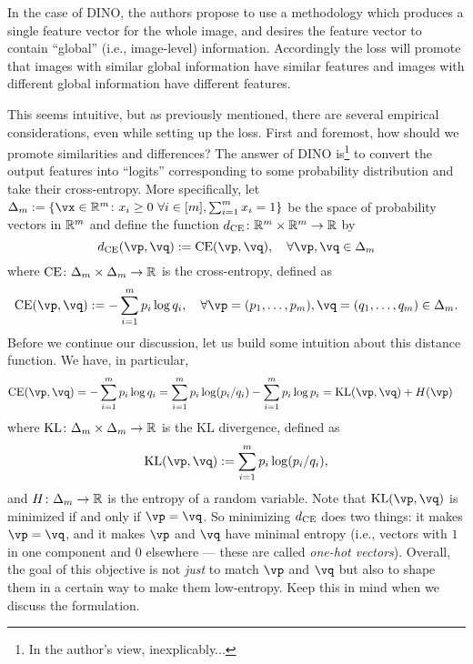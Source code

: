 \documentclass[\toplevelprefix/book-main.tex]{subfiles}
\begin{document}
In the case of DINO, the authors propose to use a methodology which produces a single feature vector for the whole image, and desires the feature vector to contain ``global'' (i.e., image-level) information. Accordingly the loss will promote that images with similar global information have similar features and images with different global information have different features.

This seems intuitive, but as previously mentioned, there are several empirical considerations, even while setting up the loss. First and foremost, how should we promote similarities and differences? The answer of DINO \citep{caron2021emerging} is\footnote{In the author's view, inexplicably...} to convert the output features into ``logits'' corresponding to some probability distribution and take their cross-entropy. More specifically, let \(\Delta_{m} := \{\vx \in \R^{m} \colon x_{i} \geq 0\ \forall i \in [m], \sum_{i = 1}^{m}x_{i} = 1\}\) be the space of probability vectors in \(\mathbb{R}^{m}\) and define the function \(d_{\operatorname{CE}} \colon \mathbb{R}^{m} \times \mathbb{R}^{m} \to \mathbb{R}\) by
 \begin{equation}\label{eq:cross_entropy_difference}
    d_{\CE}(\vp, \vq) := \CE(\vp, \vq), \quad \forall \vp, \vq \in \Delta_{m}
 \end{equation}
 where \(\operatorname{CE} \colon \Delta_{m} \times \Delta_{m} \to \mathbb{R}\) is the cross-entropy, defined as 
 \begin{equation}\label{eq:expts_def_ce}
    \CE(\vp, \vq) := -\sum_{i = 1}^{m}p_{i}\log q_{i}, \quad \forall \vp = (p_{1}, \dots, p_{m}), \vq = (q_{1}, \dots, q_{m}) \in \Delta_{m}.
 \end{equation}
 Before we continue our discussion, let us build some intuition about this distance function. We have, in particular,
 \begin{align}
    \CE(\vp, \vq)
    &= -\sum_{i = 1}^{m}p_{i}\log q_{i} = \sum_{i = 1}^{m}p_{i}\log(p_{i}/q_{i}) - \sum_{i = 1}^{m}p_{i}\log p_{i} = \KL(\vp, \vq) + H(\vp)
 \end{align}
 where \(\operatorname{KL} \colon \Delta_{m} \times \Delta_{m} \to \mathbb{R}\) is the KL divergence, defined as 
 \begin{equation}
    \KL(\vp, \vq) := \sum_{i = 1}^{m}p_{i}\log(p_{i}/q_{i}),
 \end{equation}
 and \(H \colon \Delta_{m} \to \mathbb{R}\) is the entropy of a random variable. Note that \(\KL(\vp, \vq)\) is minimized if and only if \(\vp = \vq\). So minimizing \(d_{\operatorname{CE}}\) does two things: it makes \(\vp = \vq\), and it makes \(\vp\) and \(\vq\) have minimal entropy (i.e., vectors with \(1\) in one component and \(0\) elsewhere --- these are called \textit{one-hot vectors}). Overall, the goal of this objective is not \textit{just} to match \(\vp\) and \(\vq\) but also to shape them in a certain way to make them low-entropy. Keep this in mind when we discuss the formulation.
\end{document}
